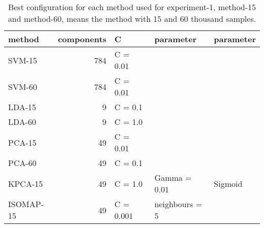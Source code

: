 \begin{table}[htb!]   
    \centering
    \begin{tabular}{lrlll}
        \toprule
        method & components & C & parameter & parameter\\
        \midrule
        SVM-15 & 784 & C = 0.01 &  \\
        SVM-60 & 784 & C = 0.01 &  \\
        LDA-15 & 9 & C = 0.1 &  \\
        LDA-60 & 9 & C = 1.0 &  \\
        PCA-15 & 49 & C = 0.01 &  \\
        PCA-60 & 49 & C = 0.1 &   \\
        KPCA-15 & 49 & C = 1.0 & Gamma = 0.01 & Sigmoid \\
        ISOMAP-15 & 49 & C = 0.001 & neighbours = 5 \\
        \bottomrule
    \end{tabular}
    \caption{Best configuration for each method used for experiment-1, method-15 and method-60, means the method with 15 and 60 thousand samples.}
    \label{tab:best-configuration}
\end{table}